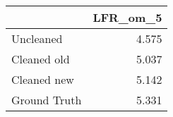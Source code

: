 \begin{tabular}{lr}
\toprule
{} & LFR_om_5 \\
\midrule
Uncleaned    &    4.575 \\
Cleaned old  &    5.037 \\
Cleaned new  &    5.142 \\
Ground Truth &    5.331 \\
\bottomrule
\end{tabular}
